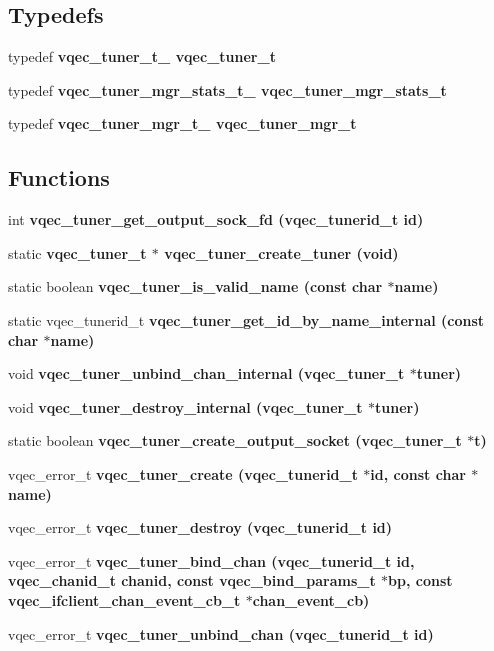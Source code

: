 \subsection*{Typedefs}
\begin{CompactItemize}
\item 
typedef \bf{vqec\_\-tuner\_\-t\_\-} \bf{vqec\_\-tuner\_\-t}
\item 
typedef \bf{vqec\_\-tuner\_\-mgr\_\-stats\_\-t\_\-} \bf{vqec\_\-tuner\_\-mgr\_\-stats\_\-t}
\item 
typedef \bf{vqec\_\-tuner\_\-mgr\_\-t\_\-} \bf{vqec\_\-tuner\_\-mgr\_\-t}
\end{CompactItemize}
\subsection*{Functions}
\begin{CompactItemize}
\item 
int \bf{vqec\_\-tuner\_\-get\_\-output\_\-sock\_\-fd} (vqec\_\-tunerid\_\-t id)
\item 
static \bf{vqec\_\-tuner\_\-t} $\ast$ \bf{vqec\_\-tuner\_\-create\_\-tuner} (void)
\item 
static boolean \bf{vqec\_\-tuner\_\-is\_\-valid\_\-name} (const char $\ast$name)
\item 
static vqec\_\-tunerid\_\-t \bf{vqec\_\-tuner\_\-get\_\-id\_\-by\_\-name\_\-internal} (const char $\ast$name)
\item 
void \bf{vqec\_\-tuner\_\-unbind\_\-chan\_\-internal} (\bf{vqec\_\-tuner\_\-t} $\ast$tuner)
\item 
void \bf{vqec\_\-tuner\_\-destroy\_\-internal} (\bf{vqec\_\-tuner\_\-t} $\ast$tuner)
\item 
static boolean \bf{vqec\_\-tuner\_\-create\_\-output\_\-socket} (\bf{vqec\_\-tuner\_\-t} $\ast$t)
\item 
vqec\_\-error\_\-t \bf{vqec\_\-tuner\_\-create} (vqec\_\-tunerid\_\-t $\ast$id, const char $\ast$name)
\item 
vqec\_\-error\_\-t \bf{vqec\_\-tuner\_\-destroy} (vqec\_\-tunerid\_\-t id)
\item 
vqec\_\-error\_\-t \bf{vqec\_\-tuner\_\-bind\_\-chan} (vqec\_\-tunerid\_\-t id, \bf{vqec\_\-chanid\_\-t} chanid, const \bf{vqec\_\-bind\_\-params\_\-t} $\ast$bp, const \bf{vqec\_\-ifclient\_\-chan\_\-event\_\-cb\_\-t} $\ast$chan\_\-event\_\-cb)
\item 
vqec\_\-error\_\-t \bf{vqec\_\-tuner\_\-unbind\_\-chan} (vqec\_\-tunerid\_\-t id)
\item 

\end{CompactItemize}
